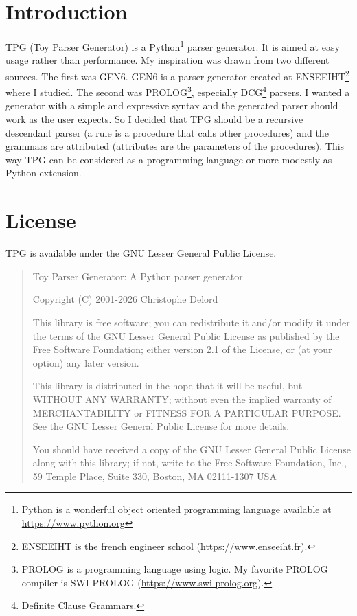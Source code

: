 \section{Introduction}

TPG (Toy Parser Generator) is a Python\footnote{Python is a wonderful object oriented programming language available at \url{https://www.python.org}} parser generator.
It is aimed at easy usage rather than performance.
My inspiration was drawn from two different sources.
The first was GEN6. GEN6 is a parser generator created at ENSEEIHT\footnote{ENSEEIHT is the french engineer school (\url{https://www.enseeiht.fr}).} where I studied.
The second was PROLOG\footnote{PROLOG is a programming language using logic. My favorite PROLOG compiler is SWI-PROLOG (\url{https://www.swi-prolog.org}).}, especially DCG\footnote{Definite Clause Grammars.} parsers.
I wanted a generator with a simple and expressive syntax and the generated parser should work as the user expects. So I decided that TPG should be a recursive descendant parser (a rule is a procedure that calls other procedures) and the grammars are attributed (attributes are the parameters of the procedures).
This way TPG can be considered as a programming language or more modestly as Python extension.

\section{License}

TPG is available under the GNU Lesser General Public License.

\begin{quote}
Toy Parser Generator: A Python parser generator

Copyright (C) 2001-2026 Christophe Delord

This library is free software; you can redistribute it and/or
modify it under the terms of the GNU Lesser General Public
License as published by the Free Software Foundation; either
version 2.1 of the License, or (at your option) any later version.

This library is distributed in the hope that it will be useful,
but WITHOUT ANY WARRANTY; without even the implied warranty of
MERCHANTABILITY or FITNESS FOR A PARTICULAR PURPOSE.  See the GNU
Lesser General Public License for more details.

You should have received a copy of the GNU Lesser General Public
License along with this library; if not, write to the Free Software
Foundation, Inc., 59 Temple Place, Suite 330, Boston, MA  02111-1307  USA
\end{quote}

